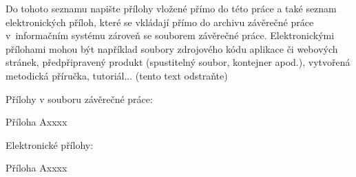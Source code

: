 \documentclass{vdocdiplcz}
\begin{document}
\maketitlepages

\tableofcontents\clearpage

\nastavodstavec   %
\radkovani   %

\mainmatter










\renewcommand{\refname}{Seznam použité literatury}

\begingroup

\endgroup

%
\listoffigures\clearpage
%
\listoftables\clearpage






\clearpage
%
\clearpage
%
\appendix
%

  \rule{0pt}{1pt}\thispagestyle{empty}
    \par
    \noindent{\Huge\bfseries\scshape\appendixpagename}
    \vspace{7em}
    
Do tohoto seznamu napište přílohy vložené přímo do této práce a také seznam elektronických příloh, které se vkládají přímo do archivu závěrečné práce v informačním systému zároveň se souborem závěrečné práce. Elektronickými přílohami mohou být například soubory zdrojového kódu aplikace či webových stránek, předpřipravený produkt (spustitelný soubor, kontejner apod.), vytvořená metodická příručka, tutoriál... (tento text odstraňte)
		
\begin{citemize}
	\item Přílohy v souboru závěrečné práce:
	\begin{citemize}
		\item Příloha A\quad xxxx
		\item 
	\end{citemize}
	\item Elektronické přílohy:
	\begin{citemize}
		\item Příloha A\quad xxxx
		\item 
	\end{citemize}
\end{citemize}
    \rule{0pt}{1pt}

  \clearpage

%
\end{document}
